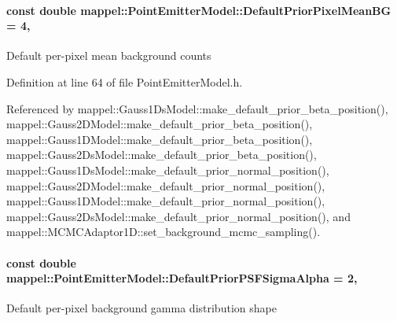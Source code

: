 \paragraph[{\texorpdfstring{Default\+Prior\+Pixel\+Mean\+BG}{DefaultPriorPixelMeanBG}}]{\setlength{\rightskip}{0pt plus 5cm}const double mappel\+::\+Point\+Emitter\+Model\+::\+Default\+Prior\+Pixel\+Mean\+BG = 4\hspace{0.3cm}{\ttfamily [static]}, {\ttfamily [inherited]}}\hypertarget{classmappel_1_1PointEmitterModel_a72efb3ee01fa548683d510288266fea5}{}\label{classmappel_1_1PointEmitterModel_a72efb3ee01fa548683d510288266fea5}
Default per-\/pixel mean background counts 

Definition at line 64 of file Point\+Emitter\+Model.\+h.



Referenced by mappel\+::\+Gauss1\+Ds\+Model\+::make\+\_\+default\+\_\+prior\+\_\+beta\+\_\+position(), mappel\+::\+Gauss2\+D\+Model\+::make\+\_\+default\+\_\+prior\+\_\+beta\+\_\+position(), mappel\+::\+Gauss1\+D\+Model\+::make\+\_\+default\+\_\+prior\+\_\+beta\+\_\+position(), mappel\+::\+Gauss2\+Ds\+Model\+::make\+\_\+default\+\_\+prior\+\_\+beta\+\_\+position(), mappel\+::\+Gauss1\+Ds\+Model\+::make\+\_\+default\+\_\+prior\+\_\+normal\+\_\+position(), mappel\+::\+Gauss2\+D\+Model\+::make\+\_\+default\+\_\+prior\+\_\+normal\+\_\+position(), mappel\+::\+Gauss1\+D\+Model\+::make\+\_\+default\+\_\+prior\+\_\+normal\+\_\+position(), mappel\+::\+Gauss2\+Ds\+Model\+::make\+\_\+default\+\_\+prior\+\_\+normal\+\_\+position(), and mappel\+::\+M\+C\+M\+C\+Adaptor1\+D\+::set\+\_\+background\+\_\+mcmc\+\_\+sampling().

\paragraph[{\texorpdfstring{Default\+Prior\+P\+S\+F\+Sigma\+Alpha}{DefaultPriorPSFSigmaAlpha}}]{\setlength{\rightskip}{0pt plus 5cm}const double mappel\+::\+Point\+Emitter\+Model\+::\+Default\+Prior\+P\+S\+F\+Sigma\+Alpha = 2\hspace{0.3cm}{\ttfamily [static]}, {\ttfamily [inherited]}}\hypertarget{classmappel_1_1PointEmitterModel_a2b06111eaa1ff284851c2e67a3827220}{}\label{classmappel_1_1PointEmitterModel_a2b06111eaa1ff284851c2e67a3827220}
Default per-\/pixel background gamma distribution shape 

